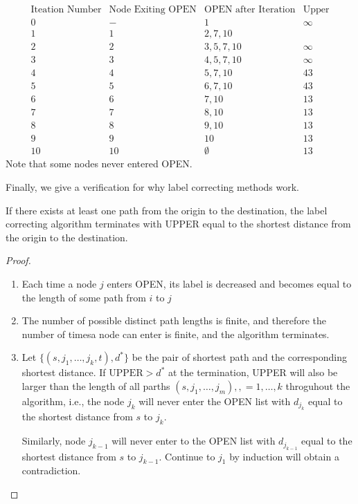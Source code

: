 \[
\begin{array}{cccc}
\text{Iteation Number}&\text{Node Exiting OPEN}&\text{OPEN after Iteration}&\text{Upper}\\
0&-&1&\infty\\
1&1&2,7,10\\
2&2&3,5,7,10&\infty\\
3&3&4,5,7,10&\infty\\
4&4&5,7,10&43\\
5&5&6,7,10&43\\
6&6&7,10&13\\
7&7&8,10&13\\
8&8&9,10&13\\
9&9&10&13\\
10&10&\emptyset&13
\end{array}
\]
Note that some nodes never entered OPEN.

Finally, we give a verification for why label correcting methods work.
\begin{proposition}
If there exists at least one path from the origin to the destination, the label correcting algorithm terminates with UPPER equal to the shortest distance from the origin to the destination.
\end{proposition}
\begin{proof}
\begin{enumerate}
\item
Each time a node $j$ enters OPEN, its label is decreased and becomes equal to the length of some path from $i$ to $j$
\item
The number of possible distinct path lengths is finite, and therefore the number of timesa node can enter is finite, and the algorithm terminates.
\item
Let $\{(s,j_1,\dots,j_k,t),d^*\}$ be the pair of shortest path and the corresponding shortest distance.
If $\text{UPPER}>d^*$ at the termination, UPPER will also be larger than the length of all parths $(s,j_1,\dots,j_m), ,=1,\dots,k$ throguhout the algorithm, i.e., the node $j_k$ will never enter the OPEN list with $d_{j_k}$ equal to the shortest distance from $s$ to $j_k$.

Similarly, node $j_{k-1}$ will never enter to the OPEN list with $d_{j_{k-1}}$ equal to the shortest distance from $s$ to $j_{k-1}$. 
Continue to $j_1$ by induction will obtain a contradiction.
\end{enumerate}
\end{proof}
















